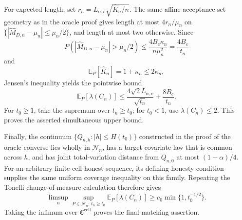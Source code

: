 For expected length, set \(r_n=L_{\alpha,c}\sqrt{\widehat K_n/n}\).  The same affine-acceptance-set geometry as in the oracle proof gives length at most \(4r_n/\mu_n\) on
\(\{|\widehat M_{D,n}-\mu_n|\le\mu_n/2\}\), and length at most two otherwise.  Since
\[
 P(|\widehat M_{D,n}-\mu_n|>\mu_n/2)
 \le\frac{4B_c\kappa_n}{n\mu_n^2}
 =\frac{4B_c}{t_n}
\]
and
\[
 \mathbb E_P[\widehat K_n]=1+\kappa_n\le2\kappa_n,
\]
Jensen's inequality yields the pointwise bound
\[
 \mathbb E_P[\lambda(C_n)]
 \le\frac{4\sqrt2L_{\alpha,c}}{\sqrt{t_n}}+
 \frac{8B_c}{t_n}.
\]
For \(t_0\ge1\), take the supremum over \(t_n\ge t_0\); for \(t_0<1\), use \(\lambda(C_n)\le2\).  This proves the asserted simultaneous upper bound.

Finally, the continuum \(\{Q_{n,h}:|h|\le H(t_0)\}\) constructed in the proof of the oracle converse lies wholly in \(\mathcal N_n\), has a target covariate law that is common across \(h\), and has joint total-variation distance from \(Q_{n,0}\) at most \((1-\alpha)/4\).  For an arbitrary finite-cell-honest sequence, its defining honesty condition supplies the same uniform coverage inequality on this family.  Repeating the Tonelli change-of-measure calculation therefore gives
\[
 \limsup_n\sup_{P\in\mathcal N_n:\,t_n\ge t_0}
 \mathbb E_P[\lambda(C_n)]
 \ge c_0\min\{1,t_0^{-1/2}\}.
\]
Taking the infimum over \(\mathfrak C^{\mathrm{cell}}\) proves the final matching assertion.